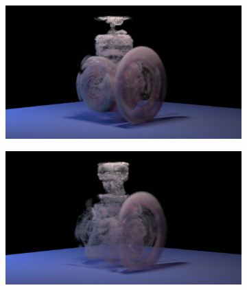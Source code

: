 \documentclass[11pt]{article}
\begin{document}
\begin{figure}
\begin{subfigure}[h]{0.5\textwidth}
	\end{subfigure}
	\begin{subfigure}[h]{0.5\textwidth}
		\centering
		\includegraphics[width=\textwidth]{Figures/renders/plume0014.png}
	\end{subfigure}
	\begin{subfigure}[h]{0.5\textwidth}
		\centering
		\includegraphics[width=\textwidth]{Figures/renders/plume0015.png}
	\end{subfigure}
	
\end{figure}

\end{document}
